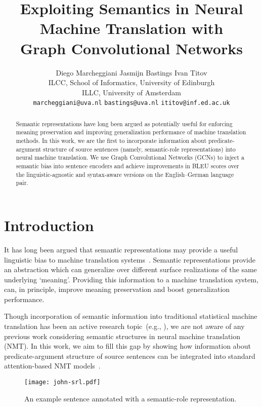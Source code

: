 \documentclass[11pt,a4paper]{article}
\title{Exploiting Semantics in Neural Machine Translation with \\ Graph Convolutional Networks}
\author{
 Diego Marcheggiani \hspace{1cm} Jasmijn Bastings\hspace{1cm} Ivan Titov    \\
 ILCC, School of Informatics, University of Edinburgh \\
 ILLC,  University of Amsterdam  \\
    {\tt marcheggiani@uva.nl} \hspace{0.3cm} {\tt bastings@uva.nl} \hspace{0.3cm} {\tt ititov@inf.ed.ac.uk}
 }
\date{}
\begin{document}
\maketitle
\begin{abstract}
  Semantic representations have long been argued as potentially useful for enforcing meaning preservation and improving generalization performance of machine translation methods. 
  In this work, we are the first to incorporate information about predicate-argument structure of source sentences (namely, semantic-role representations) into neural machine translation. We use Graph Convolutional Networks (GCNs) to inject a semantic bias into sentence encoders and achieve improvements in BLEU scores over the linguistic-agnostic and syntax-aware versions on the English--German language pair.  

\end{abstract}

\section{Introduction}

It has long been argued that semantic representations may provide a useful linguistic bias to machine translation systems~\cite{weaver1955translation,bar1960present}. Semantic
representations provide an abstraction which can generalize over different surface realizations of the same underlying `meaning'. 
Providing this information to a machine translation system, can, in principle, improve meaning preservation and boost generalization performance.

Though incorporation of semantic information into traditional statistical machine translation has been an active research topic~(e.g., \cite{baker-etal:2012:CL,DBLP:conf/coling/LiuG10,DBLP:conf/naacl/WuF09,DBLP:conf/acl/BazrafshanG13,DBLP:conf/wmt/AzizRS11,C12-1083}), we are not aware of any previous work considering semantic structures in neural machine translation (NMT). In this work, we aim to fill this gap by showing how information about predicate-argument structure of source sentences can be integrated into standard attention-based NMT models~\cite{bahdanau15iclr}.

\begin{figure}
\begin{center}
\texttt{[image: john-srl.pdf]}
\vspace{-3ex}
\caption{ 
An example sentence annotated with a semantic-role representation.
\label{fig:srl-example}} 
\vspace{-2.5ex}
\end{center}
\end{figure}
\end{document}
